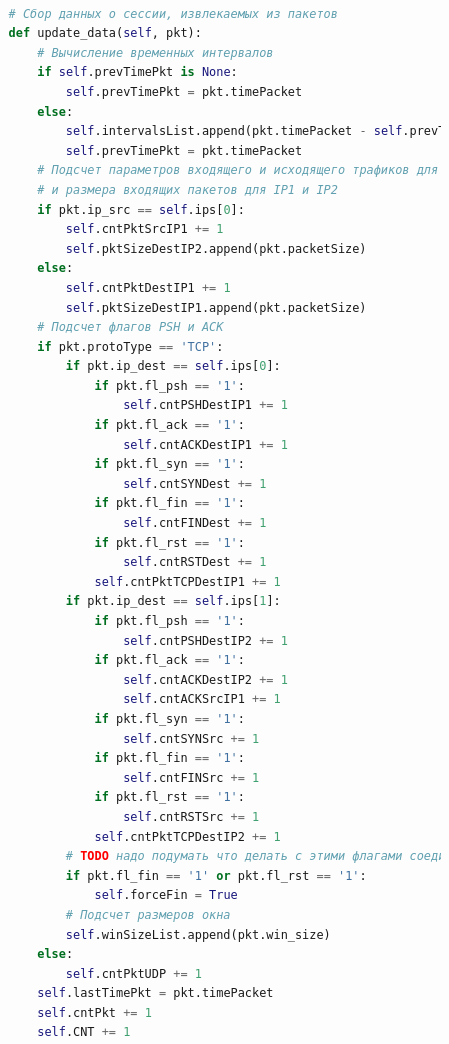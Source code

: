 \documentclass[bachelor, och, coursework]{SCWorks}
\begin{document}
\begin{lstlisting}[language=Python]
      
          # Сбор данных о сессии, извлекаемых из пакетов
          def update_data(self, pkt):
              # Вычисление временных интервалов
              if self.prevTimePkt is None:
                  self.prevTimePkt = pkt.timePacket
              else:
                  self.intervalsList.append(pkt.timePacket - self.prevTimePkt)
                  self.prevTimePkt = pkt.timePacket
              # Подсчет параметров входящего и исходящего трафиков для IP1
              # и размера входящих пакетов для IP1 и IP2
              if pkt.ip_src == self.ips[0]:
                  self.cntPktSrcIP1 += 1
                  self.pktSizeDestIP2.append(pkt.packetSize)
              else:
                  self.cntPktDestIP1 += 1
                  self.pktSizeDestIP1.append(pkt.packetSize)
              # Подсчет флагов PSH и ACK
              if pkt.protoType == 'TCP':
                  if pkt.ip_dest == self.ips[0]:
                      if pkt.fl_psh == '1':
                          self.cntPSHDestIP1 += 1
                      if pkt.fl_ack == '1':
                          self.cntACKDestIP1 += 1
                      if pkt.fl_syn == '1':
                          self.cntSYNDest += 1
                      if pkt.fl_fin == '1':
                          self.cntFINDest += 1
                      if pkt.fl_rst == '1':
                          self.cntRSTDest += 1
                      self.cntPktTCPDestIP1 += 1
                  if pkt.ip_dest == self.ips[1]:
                      if pkt.fl_psh == '1':
                          self.cntPSHDestIP2 += 1
                      if pkt.fl_ack == '1':
                          self.cntACKDestIP2 += 1
                          self.cntACKSrcIP1 += 1
                      if pkt.fl_syn == '1':
                          self.cntSYNSrc += 1
                      if pkt.fl_fin == '1':
                          self.cntFINSrc += 1
                      if pkt.fl_rst == '1':
                          self.cntRSTSrc += 1
                      self.cntPktTCPDestIP2 += 1
                  # TODO надо подумать что делать с этими флагами соединения
                  if pkt.fl_fin == '1' or pkt.fl_rst == '1':
                      self.forceFin = True
                  # Подсчет размеров окна
                  self.winSizeList.append(pkt.win_size)
              else:
                  self.cntPktUDP += 1
              self.lastTimePkt = pkt.timePacket
              self.cntPkt += 1
              self.CNT += 1
      

\end{lstlisting}
\end{document}
